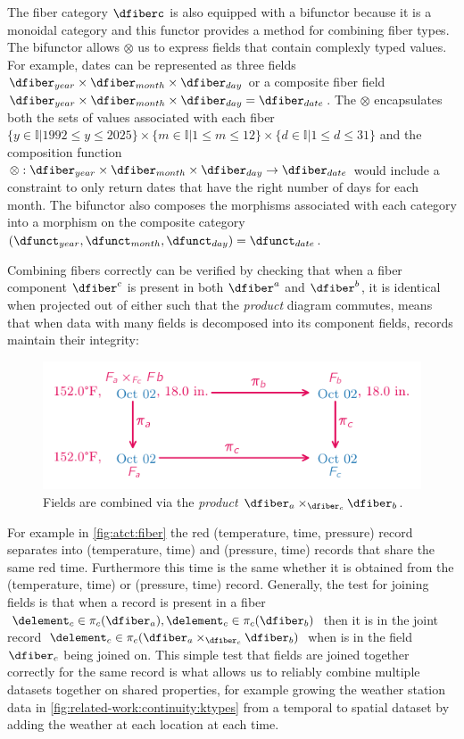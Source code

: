\documentclass[journal]{IEEEtran}
\theoremstyle{definition}
\theoremstyle{remark}
\begin{document}
The fiber category $\mathcal{\dfiberc}$ is also equipped with a bifunctor because it is a monoidal category and this functor provides a method for combining fiber types. The bifunctor allows $\otimes$ us to express fields that contain complexly typed values. For example, dates can be represented as three fields $\dfiber_{year} \times \dfiber_{month} \times \dfiber_{day}$ or a composite fiber field $\dfiber_{year} \times \dfiber_{month} \times \dfiber_{day} = \dfiber_{date}$. The $\otimes$ encapsulates both the sets of values associated with each fiber $\{y \in \mathbb{I}\vert 1992 \leq y \leq 2025\} \times \{m \in \mathbb{I}\vert 1 \leq m \leq 12 \} \times \{d \in \mathbb{I}\vert 1 \leq d \leq 31 \}$ and the composition function $ \otimes: \dfiber_{year} \times \dfiber_{month} \times \dfiber_{day} \rightarrow \dfiber_{date}$
would include a constraint to only return dates that have the right number of days for each month. The bifunctor also composes the morphisms associated with each category into a morphism on the composite category $(\dfunct_{year}, \dfunct_{month}, \dfunct_{day}) = \dfunct_{date}$.

Combining fibers correctly can be verified by checking that when a fiber component $\dfiber^{c}$ is present in both $\dfiber^{a}$ and $\dfiber^{b}$, it is identical when projected out of either such that the \textit{product} diagram commutes, means that when data with many fields is decomposed into its component fields, records maintain their integrity:

\begin{figure}[H]
  \includegraphics*[width=1\columnwidth]{figures/tex/f_product.pdf}
  \caption{Fields are combined via the \textit{product} $\dfiber_{a}\times_{\dfiber_c} \dfiber_{b}$.}
  \label{fig:atct:fiber}
\end{figure}

For example in \autoref{fig:atct:fiber} the red (temperature, time, pressure) record separates into (temperature, time) and (pressure, time) records that share the same red time. Furthermore this time is the same whether it is obtained from the (temperature, time) or (pressure, time) record. Generally, the test for joining fields is that when a record is present in a fiber $\delement_{c} \in \pi_c(\dfiber_{a}), \delement_c \in \pi_c(\dfiber_{b})$ then it is in the joint record $\delement_{c} \in \pi_c(\dfiber_{a}\times_{\dfiber_c}\dfiber_{b})$ when is in the field $\dfiber_c$ being joined on. This simple test that fields are joined together correctly for the same record is what allows us to reliably combine multiple datasets together on shared properties, for example growing the weather station data in \autoref{fig:related-work:continuity:ktypes} from a temporal to spatial dataset by adding the weather at each location at each time.
\end{document}
